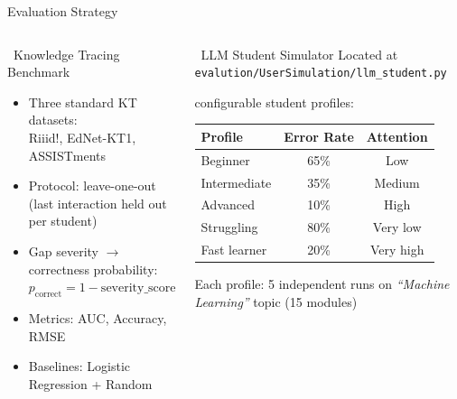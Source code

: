 \documentclass[aspectratio=169,9pt]{beamer}
\begin{document}
\begin{frame}{Evaluation Strategy}
\begin{columns}[T]
  \begin{block}{\faFlask\ Knowledge Tracing Benchmark}
    \begin{itemize}
      \item Three standard KT datasets:\\
        Riiid!, EdNet-KT1, ASSISTments
      \item Protocol: leave-one-out \\
        (last interaction held out per student)
      \item Gap severity $\to$ correctness probability:\\
        $p_{\text{correct}} = 1 - \text{severity\_score}$
      \item Metrics: AUC, Accuracy, RMSE
      \item Baselines: Logistic Regression + Random
    \end{itemize}
  \end{block}

  \begin{block}{\faRobot\ LLM Student Simulator}
    Located at \texttt{evalution/UserSimulation/llm\_student.py}

     configurable student profiles:
    \small
    \begin{tabular}{lcc}
      \textbf{Profile}  & \textbf{Error Rate} & \textbf{Attention} \\
      \midrule
      Beginner          & 65\%  & Low      \\
      Intermediate      & 35\%  & Medium   \\
      Advanced          & 10\%  & High     \\
      Struggling        & 80\%  & Very low \\
      Fast learner      & 20\%  & Very high \\
    \end{tabular}

    \medskip
    \normalsize
    Each profile: 5 independent runs on \textit{``Machine Learning''} topic (15 modules)
  \end{block}
\end{columns}
\end{frame}
\end{document}

